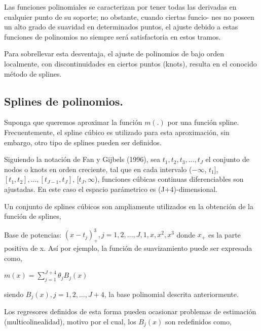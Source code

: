 \hspace*{0.4 cm} Las funciones polinomiales se caracterizan por tener todas las derivadas en cualquier punto de su soporte; no obstante, cuando ciertas funcio- nes no poseen un alto grado de suavidad en determinados puntos, el ajuste debido a estas funciones de polinomios no siempre ser\'a satisfactoria en estos tramos.

\hspace*{0.4 cm} Para sobrellevar esta desventaja, el ajuste de polinomios de bajo orden localmente, con discontinuidades en ciertos puntos (knots), resulta en el conocido m\'etodo de splines.

\subsection{Splines de polinomios.\\}


\hspace*{0.4 cm}Suponga que queremos aproximar la funci\'on $m(.)$ por una funci\'on spline. Frecuentemente, el spline c\'ubico es utilizado para esta aproximaci\'on, sin embargo, otro tipo de splines pueden ser definidos.


\hspace*{0.4 cm}Siguiendo la notaci\'on de Fan y Gijbels (1996), sea $t_{1}, t_{2}, t_{3},...,t_{J}$ el conjunto de nodos o knots en orden creciente, tal que en cada intervalo  ($-\infty$, $t_{1}$], $[t_{1}, t_{2}],..., [t_{J-1}, t_{J}]$, [$t_{J}, \infty$), funciones c\'ubicas continuas diferenciables son ajustadas. En este caso el espacio par\'ametrico es (J+4)-dimensional.

\hspace*{0.4 cm} Un conjunto de splines c\'ubicos son ampliamente utilizados en la obtenci\'on de la funci\'on de splines,

\hspace*{0.4 cm} Base de potencias:  $(x- t_{j})_{+}^{3}, j= 1,2,...,J,1,x,x^2,x^3$ donde $x_{+}$ es la parte positiva de x. As\'i por ejemplo, la funci\'on de suavizamiento puede ser expresada como,

\begin{center}
$\displaystyle{ m(x) = \sum_{j=1}^{J+4} \theta_{j}B_{j}(x) }$
\end{center}

\noindent siendo $B_{j}(x), j = 1, 2,... , J+4$, la base polinomial descrita anteriormente.

\hspace*{0.4 cm} Los regresores definidos de esta forma pueden ocasionar problemas de estimaci\'on (multicolinealidad), motivo por el cual, los $B_{j}(x)$ son
redefinidos como,

